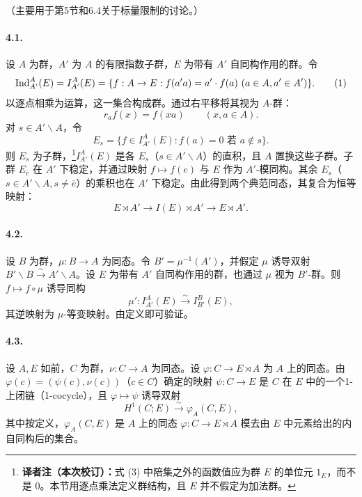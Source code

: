 （主要用于第5节和6.4关于标量限制的讨论。）

\paragraph*{4.1.} 设 $A$ 为群，$A'$ 为 $A$ 的有限指数子群，$E$ 为带有 $A'$ 自同构作用的群。令
\begin{equation}
 \operatorname{Ind}_{A'}^A(E)=I_{A'}^A(E)=\{f:A\to E:f(a'a)=a'\cdot f(a)\ (a\in A,a'\in A')\}.\tag{1}
\end{equation}
以逐点相乘为运算，这一集合构成群。通过右平移将其视为 $A$-群：
\begin{equation}
 r_a f(x)=f(xa)\qquad(x,a\in A).\tag{2}
\end{equation}
对 $s\in A'\backslash A$，令
\begin{equation}
 E_s=\{f\in I_{A'}^A(E):f(a)=0\text{ 若 }a\notin s\}.\tag{3}
\end{equation}
则 $E_s$ 为子群，\footnote{\textbf{译者注（本次校订）：}式 (3) 中陪集之外的函数值应为群 $E$ 的单位元 $1_E$，而不是 $0$。本节用逐点乘法定义群结构，且 $E$ 并不假定为加法群。}$I_{A'}^A(E)$ 是各 $E_s$（$s\in A'\backslash A$）的直积，且 $A$ 置换这些子群。子群 $E_{\overline e}$ 在 $A'$ 下稳定，并通过映射 $f\mapsto f(e)$ 与 $E$ 作为 $A'$-模同构。其余 $E_s$（$s\in A'\backslash A,s\neq\overline e$）的乘积也在 $A'$ 下稳定。由此得到两个典范同态，其复合为恒等映射：
\begin{equation}
 E\rtimes A'\longrightarrow I(E)\rtimes A'\longrightarrow E\rtimes A'.\tag{4}
\end{equation}

\paragraph*{4.2.} 设 $B$ 为群，$\mu:B\to A$ 为同态。令 $B'=\mu^{-1}(A')$，并假定 $\mu$ 诱导双射 $B'\backslash B\xrightarrow{\sim}A'\backslash A$。设 $E$ 为带有 $A'$ 自同构作用的群，也通过 $\mu$ 视为 $B'$-群。则 $f\mapsto f\circ\mu$ 诱导同构
\begin{equation}
 \mu':I_{A'}^A(E)\xrightarrow{\sim}I_{B'}^B(E),\tag{1}
\end{equation}
其逆映射为 $\mu$-等变映射。由定义即可验证。

\paragraph*{4.3.} 设 $A,E$ 如前，$C$ 为群，$\nu:C\to A$ 为同态。设 $\varphi:C\to E\rtimes A$ 为 $A$ 上的同态。由 $\varphi(c)=(\psi(c),\nu(c))$（$c\in C$）确定的映射 $\psi:C\to E$ 是 $C$ 在 $E$ 中的一个1-上闭链（1-cocycle），且 $\varphi\mapsto\psi$ 诱导双射
\[
 H^1(C;E)\xrightarrow{\sim}\varphi_A(C,E),
\]
其中按定义，$\varphi_A(C,E)$ 是 $A$ 上的同态 $\varphi:C\to E\rtimes A$ 模去由 $E$ 中元素给出的内自同构后的集合。

